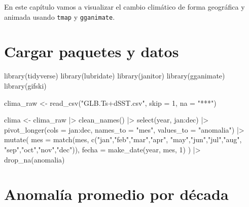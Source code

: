 \documentclass[
  letterpaper,
  DIV=11,
  numbers=noendperiod]{scrreprt}
\newenvironment{Shaded}{\begin{snugshade}}{\end{snugshade}}
\newcommand{\AttributeTok}[1]{\textcolor[rgb]{0.40,0.45,0.13}{#1}}
\newcommand{\DecValTok}[1]{\textcolor[rgb]{0.68,0.00,0.00}{#1}}
\newcommand{\FunctionTok}[1]{\textcolor[rgb]{0.28,0.35,0.67}{#1}}
\newcommand{\NormalTok}[1]{\textcolor[rgb]{0.00,0.23,0.31}{#1}}
\newcommand{\OtherTok}[1]{\textcolor[rgb]{0.00,0.23,0.31}{#1}}
\newcommand{\SpecialCharTok}[1]{\textcolor[rgb]{0.37,0.37,0.37}{#1}}
\newcommand{\StringTok}[1]{\textcolor[rgb]{0.13,0.47,0.30}{#1}}
\begin{document}
En este capítulo vamos a visualizar el cambio climático de forma
geográfica y animada usando \texttt{tmap} y \texttt{gganimate}.

\section{Cargar paquetes y datos}\label{cargar-paquetes-y-datos-1}

\begin{Shaded}
\begin{Highlighting}[]
\FunctionTok{library}\NormalTok{(tidyverse)}
\FunctionTok{library}\NormalTok{(lubridate)}
\FunctionTok{library}\NormalTok{(janitor)}
\FunctionTok{library}\NormalTok{(gganimate)}
\FunctionTok{library}\NormalTok{(gifski)}

\NormalTok{clima\_raw }\OtherTok{\textless{}{-}} \FunctionTok{read\_csv}\NormalTok{(}\StringTok{"GLB.Ts+dSST.csv"}\NormalTok{, }\AttributeTok{skip =} \DecValTok{1}\NormalTok{, }\AttributeTok{na =} \StringTok{"***"}\NormalTok{)}

\NormalTok{clima }\OtherTok{\textless{}{-}}\NormalTok{ clima\_raw }\SpecialCharTok{|\textgreater{}}
  \FunctionTok{clean\_names}\NormalTok{() }\SpecialCharTok{|\textgreater{}}
  \FunctionTok{select}\NormalTok{(year, jan}\SpecialCharTok{:}\NormalTok{dec) }\SpecialCharTok{|\textgreater{}}
  \FunctionTok{pivot\_longer}\NormalTok{(}\AttributeTok{cols =}\NormalTok{ jan}\SpecialCharTok{:}\NormalTok{dec,}
               \AttributeTok{names\_to  =} \StringTok{"mes"}\NormalTok{,}
               \AttributeTok{values\_to =} \StringTok{"anomalia"}\NormalTok{) }\SpecialCharTok{|\textgreater{}}
  \FunctionTok{mutate}\NormalTok{(}
    \AttributeTok{mes   =} \FunctionTok{match}\NormalTok{(mes, }\FunctionTok{c}\NormalTok{(}\StringTok{"jan"}\NormalTok{,}\StringTok{"feb"}\NormalTok{,}\StringTok{"mar"}\NormalTok{,}\StringTok{"apr"}\NormalTok{,}
                         \StringTok{"may"}\NormalTok{,}\StringTok{"jun"}\NormalTok{,}\StringTok{"jul"}\NormalTok{,}\StringTok{"aug"}\NormalTok{,}
                         \StringTok{"sep"}\NormalTok{,}\StringTok{"oct"}\NormalTok{,}\StringTok{"nov"}\NormalTok{,}\StringTok{"dec"}\NormalTok{)),}
    \AttributeTok{fecha =} \FunctionTok{make\_date}\NormalTok{(year, mes, }\DecValTok{1}\NormalTok{)}
\NormalTok{  ) }\SpecialCharTok{|\textgreater{}}
  \FunctionTok{drop\_na}\NormalTok{(anomalia)}
\end{Highlighting}
\end{Shaded}

\section{Anomalía promedio por
década}\label{anomaluxeda-promedio-por-duxe9cada}
\end{document}
